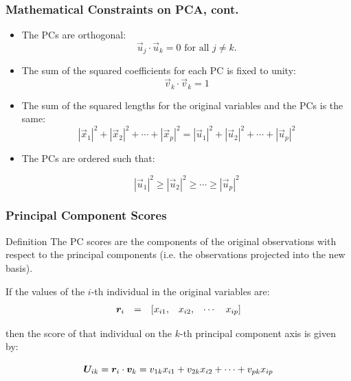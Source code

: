 \documentclass{beamer}
\begin{document}
\begin{frame}
  \frametitle{Mathematical Constraints on PCA, cont.}

\begin{itemize}
  \item The PCs are orthogonal:
\[
\vec{u}_j \cdot \vec{u}_k = 0 \mbox{ for all } j \neq k.
\]


	\item The sum of the squared coefficients for each PC is fixed to unity:
\[
\vec{v}_k \cdot \vec{v}_k = 1
\]

	\item The sum of the squared lengths for the original variables and the PCs is the same:
\[
|\vec{x}_1|^2 + |\vec{x}_2|^2 + \cdots + |\vec{x}_p|^2 = |\vec{u}_1|^2 + |\vec{u}_2|^2 + \cdots + |\vec{u}_p|^2
\]	


	\item The PCs are ordered such that:

\[
 |\vec{u}_1|^2 \geq |\vec{u}_2|^2  \geq \cdots \geq |\vec{u}_p|^2
\]

\end{itemize}

\end{frame}



\begin{frame}
  \frametitle{Principal Component Scores}

\begin{block}{Definition}
The PC scores are the components of the original observations with respect to the principal components (i.e. the observations projected into the new basis).
\end{block}
\medskip

If the values of the $i$-th individual in the original variables are:
\[
\begin{array}{cccccc}
\bm{r}_i & = & [x_{i1}, & x_{i2}, & \cdots & x_{ip}]
\end{array}
\]

then the score of that individual on the $k$-th principal component axis is given by:

\[
\bm{U}_{ik} = \bm{r}_i \cdot \bm{v}_k = v_{1k}x_{i1} + v_{2k}x_{i2} + \cdots + v_{pk}x_{ip}
\]

\end{frame}
\end{document}
